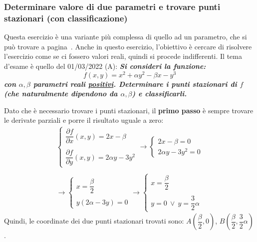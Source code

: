 \documentclass[a4paper]{article}
\begin{document}
	\subsubsection{Determinare valore di due parametri e trovare punti stazionari (con classificazione)}

	Questa esercizio è una variante più complessa di quello ad un parametro, che si può trovare a pagina~\pageref{par: determinare valore di un parametro così da trovare un punto critico}. Anche in questo esercizio, l'obiettivo è cercare di risolvere l'esercizio come se ci fossero valori reali, quindi si procede indifferenti. Il tema d'esame è quello del 01/03/2022 (A): \textcolor{Green4}{\textbf{\emph{Si consideri la funzione:}}
	\begin{equation*}
		f\left(x,y\right) = x^{2} + \alpha y^{2} - \beta x - y^{3}
	\end{equation*}
	\textbf{\emph{con $\alpha,\beta$ parametri reali \underline{positivi}. Determinare i punti stazionari di $f$ (che naturalmente dipendono da $\alpha,\beta$) e classificarli.}}}\newline

	\noindent
	Dato che è necessario trovare i punti stazionari, il \textbf{primo passo} è sempre trovare le derivate parziali e porre il risultato uguale a zero:\
	\begin{gather*}
		\begin{cases}
			\dfrac{\partial f}{\partial x}\left(x,y\right) = 2x - \beta \\
			\\
			\dfrac{\partial f}{\partial y}\left(x,y\right) = 2\alpha y - 3y^{2}
		\end{cases}
		\longrightarrow
		\begin{cases}
			2x-\beta = 0 \\
			2\alpha y - 3y^{2} = 0
		\end{cases} \\
		\\
		\longrightarrow
		\begin{cases}
			x = \dfrac{\beta}{2} \\
			\\
			y\left(2\alpha - 3y\right) = 0
		\end{cases}
		\longrightarrow
		\begin{cases}
			x = \dfrac{\beta}{2} \\
			\\
			y = 0 \: \lor \: y = \dfrac{3}{2}\alpha
		\end{cases}
	\end{gather*}
	Quindi, le coordinate dei due punti stazionari trovati sono: $A\left(\dfrac{\beta}{2}, 0\right)$, $B\left(\dfrac{\beta}{2}, \dfrac{3}{2}\alpha\right)$.\newline
\end{document}
